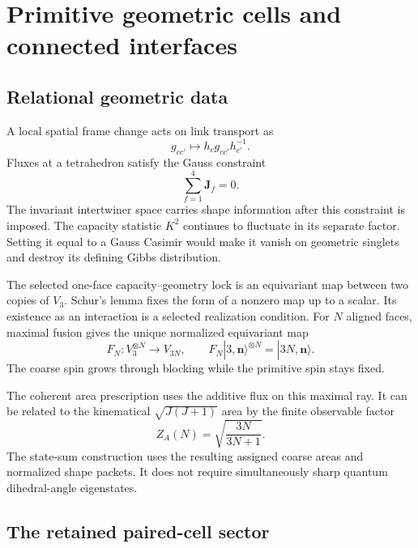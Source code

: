 \section{Primitive geometric cells and connected interfaces}
\label{sec:geometric}

\subsection{Relational geometric data}

A local spatial frame change acts on link transport as
\begin{equation}
g_{cc'}\mapsto h_cg_{cc'}h_{c'}^{-1}.
\end{equation}
Fluxes at a tetrahedron satisfy the Gauss constraint
\begin{equation}
\sum_{f=1}^4\mathbf J_f=0.
\end{equation}
The invariant intertwiner space carries shape information after this constraint is imposed. The capacity statistic $K^2$ continues to fluctuate in its separate factor. Setting it equal to a Gauss Casimir would make it vanish on geometric singlets and destroy its defining Gibbs distribution.

The selected one-face capacity--geometry lock is an equivariant map between two copies of $V_3$. Schur's lemma fixes the form of a nonzero map up to a scalar. Its existence as an interaction is a selected realization condition. For $N$ aligned faces, maximal fusion gives the unique normalized equivariant map
\begin{equation}
F_N:V_3^{\otimes N}\longrightarrow V_{3N},
\qquad
F_N|3,\mathbf n\rangle^{\otimes N}=|3N,\mathbf n\rangle.
\end{equation}
The coarse spin grows through blocking while the primitive spin stays fixed.

The coherent area prescription uses the additive flux on this maximal ray. It can be related to the kinematical $\sqrt{J(J+1)}$ area by the finite observable factor
\begin{equation}
Z_A(N)=\sqrt{\frac{3N}{3N+1}}.
\end{equation}
The state-sum construction uses the resulting assigned coarse areas and normalized shape packets. It does not require simultaneously sharp quantum dihedral-angle eigenstates.

\subsection{The retained paired-cell sector}


